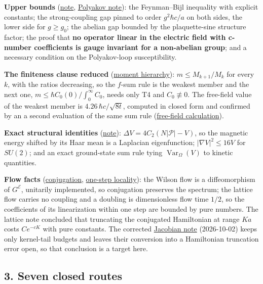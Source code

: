 \documentclass[11pt,a4paper]{article}
\begin{document}
\textbf{Upper bounds} (\href{lattice-gap-upper-bounds.md}{note},
\href{polyakov-average-gap-bound.md}{Polyakov note}): the Feynman--Bijl
inequality with explicit constants; the strong-coupling gap pinned to
order \(g^2\hbar c/a\) on both sides, the lower side for \(g\ge g_0\);
the abelian gap bounded by the plaquette-sine structure factor; the
proof that \textbf{no operator linear in the electric field with
c-number coefficients is gauge invariant for a non-abelian group}; and a
necessary condition on the Polyakov-loop susceptibility.

\textbf{The finiteness clause reduced}
(\href{moment-hierarchy-upper-bounds.md}{moment hierarchy}):
\(m\le M_{k+1}/M_k\) for every \(k\), with the ratios decreasing, so the
\(f\)-sum rule is the weakest member and the next one,
\(m\le\hbar C_0(0)/\int_0^\infty C_0\), needs only T4 and
\(C_0\not\equiv0\). The free-field value of the weakest member is
\(4.26\,\hbar c/\sqrt{8t}\), computed in closed form and confirmed by an
a second evaluation of the same sum rule
(\href{finiteness-half-flowed-susceptibility.md}{free-field
calculation}).

\textbf{Exact structural identities}
(\href{magnetic-energy-identities.md}{note}):
\(\Delta V=4C_2(N|\mathcal P|-V)\), so the magnetic energy shifted by
its Haar mean is a Laplacian eigenfunction; \(|\nabla V|^2\le16V\) for
\(SU(2)\); and an exact ground-state sum rule tying
\(\operatorname{Var}_\Omega(V)\) to kinetic quantities.

\textbf{Flow facts} (\href{flow-conjugation-truncation.md}{conjugation},
\href{flow-conjugation-truncation.md}{one-step locality}): the Wilson
flow is a diffeomorphism of \(G^{\mathcal E}\), unitarily implemented,
so conjugation preserves the spectrum; the lattice flow carries no
coupling and a doubling is dimensionless flow time \(1/2\), so the
coefficients of its linearization within one step are bounded by pure
numbers. The lattice note concluded that truncating the conjugated
Hamiltonian at range \(Ka\) costs \(Ce^{-cK}\) with pure constants. The
corrected \href{flow-jacobian-truncation-error.md}{Jacobian note}
(2026-10-02) keeps only kernel-tail budgets and leaves their conversion
into a Hamiltonian truncation error open, so that conclusion is a target
here.

\hypertarget{seven-closed-routes}{%
\subsection{3. Seven closed routes}\label{seven-closed-routes}}
\end{document}

